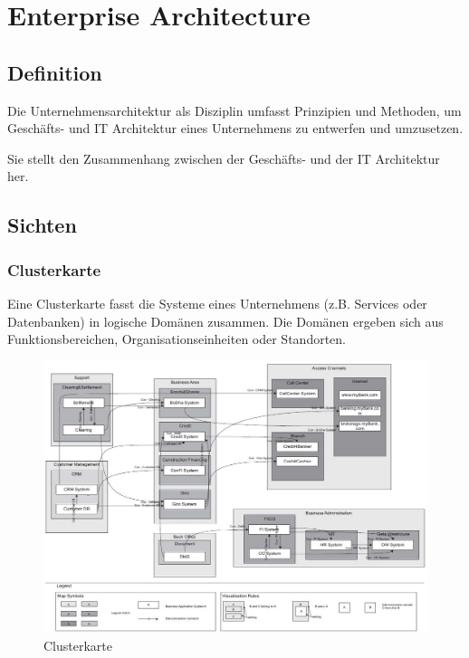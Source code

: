 \chapter{Enterprise Architecture}

\section{Definition}

Die Unternehmensarchitektur als Disziplin umfasst Prinzipien und Methoden, um Geschäfts- und IT Architektur eines Unternehmens zu entwerfen und umzusetzen.

Sie stellt den Zusammenhang zwischen der Geschäfts- und der IT Architektur her.

\section{Sichten}

\subsection{Clusterkarte}

Eine Clusterkarte fasst die Systeme eines Unternehmens (z.B. Services oder Datenbanken) in logische Domänen zusammen. Die Domänen ergeben sich aus Funktionsbereichen, Organisationseinheiten oder Standorten.

\begin{figure}[h!]
\centering
\includegraphics[width=\linewidth]{fig/clusterkarte}
\caption{Clusterkarte}
\label{fig:clusterkarte}
\end{figure}

